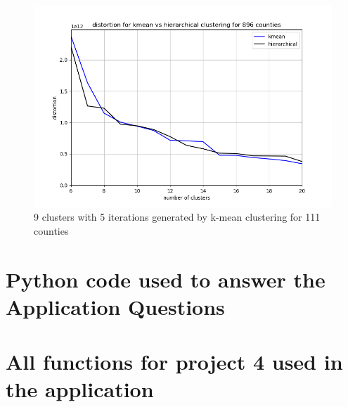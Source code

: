 \documentclass[a4paper]{article}
\begin{document}
\FloatBarrier
\begin{figure}[h]
	\centering 
	\includegraphics[scale = 0.8, clip=True, trim=1cm 1cm 0cm 1cm]{Q10_distortion_896.png}
	\caption{9 clusters with 5 iterations generated by k-mean clustering for 111 counties}
\end{figure}
\FloatBarrier

\newpage
\appendix
\section{Python code used to answer the Application Questions}

\section{All functions for project 4 used in the application}

\end{document}
